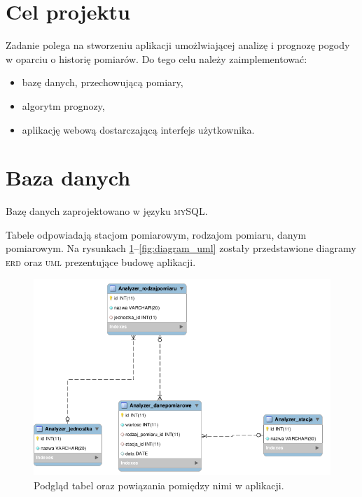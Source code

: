 \documentclass[11pt, a4paper, oneside]{mwart}
\begin{document}


\newpage
\thispagestyle{empty}

\tableofcontents
\newpage


\section{Cel projektu}

Zadanie polega na stworzeniu aplikacji umożlwiającej analizę i prognozę pogody w oparciu o historię pomiarów. Do tego celu należy zaimplementować: 
\begin{itemize}
  \item  bazę danych, przechowującą pomiary,
  \item algorytm prognozy,
  \item aplikację webową dostarczającą interfejs użytkownika.
\end{itemize}


\section{Baza danych}
Bazę danych zaprojektowano w języku \textsc{mySQL}.

Tabele odpowiadają stacjom pomiarowym, rodzajom pomiaru, danym pomiarowym. Na rysunkach \ref{fig:diagram_eer}--\ref{fig:diagram_uml} zostały przedstawione diagramy \textsc{erd} oraz \textsc{uml} prezentujące budowę aplikacji.

\begin{figure}[htbp]
  \centering
  \includegraphics[width=\textwidth]{./diagramEER}
  \caption{Podgląd tabel oraz powiązania pomiędzy nimi w aplikacji.}
  \label{fig:diagram_eer}
\end{figure}
\end{document}
